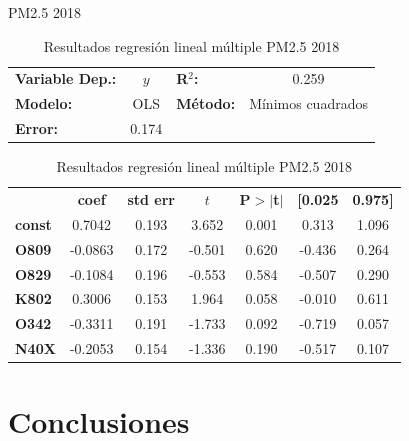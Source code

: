 \documentclass[11pt]{beamer}
\begin{document}
\begin{frame}{PM2.5 2018}
\begin{table}[hbt!]
\caption{Resultados regresión lineal múltiple PM2.5 2018}
\label{tab:RRLM PM2.5 2018}
\begin{center}
\begin{tabular}{lclc}
\textbf{Variable Dep.:}    &        $y$         & \textbf{  R$^2$:         } &     0.259   \\
\textbf{Modelo:}            &       OLS        & \textbf{Método:}           &  Mínimos cuadrados   \\
\textbf{Error:}            & 0.174  \\
\end{tabular}
\begin{tabular}{lcccccc}
               & \textbf{coef} & \textbf{std err} & \textbf{$t$} & \textbf{P$> |$t$|$} & \textbf{[0.025} & \textbf{0.975]}  \\
\textbf{const} &       0.7042  &        0.193     &     3.652  &         0.001        &        0.313    &        1.096     \\
\textbf{O809}  &      -0.0863  &        0.172     &    -0.501  &         0.620        &       -0.436    &        0.264     \\
\textbf{O829}  &      -0.1084  &        0.196     &    -0.553  &         0.584        &       -0.507    &        0.290     \\
\textbf{K802}  &       0.3006  &        0.153     &     1.964  &         0.058        &       -0.010    &        0.611     \\
\textbf{O342}  &      -0.3311  &        0.191     &    -1.733  &         0.092        &       -0.719    &        0.057     \\
\textbf{N40X}  &      -0.2053  &        0.154     &    -1.336  &         0.190        &       -0.517    &        0.107     \\
\end{tabular}
\end{center}
\end{table}
\end{frame}


\section{Conclusiones}
\end{document}
